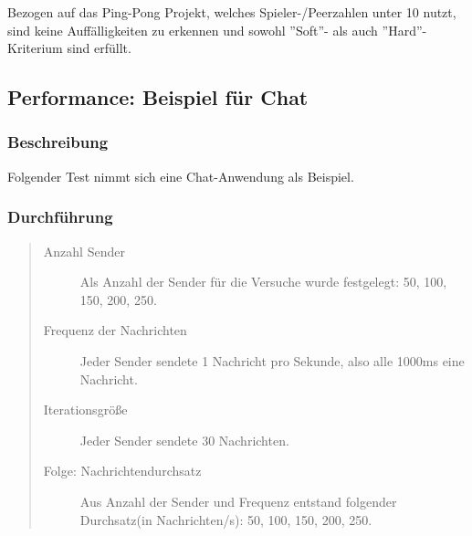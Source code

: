 Bezogen auf das Ping-Pong Projekt, welches Spieler-/Peerzahlen unter 10 nutzt, sind keine Auffälligkeiten zu erkennen und sowohl ''Soft''- als auch ''Hard''-Kriterium sind erfüllt.




\subsection{Performance: Beispiel für Chat}

\subsubsection{Beschreibung}
Folgender Test nimmt sich eine Chat-Anwendung als Beispiel.



\subsubsection{Durchführung}
\begin{quote}
  \begin{description}
  \item[Anzahl Sender]
  Als Anzahl der Sender für die Versuche wurde festgelegt: 50, 100, 150, 200, 250.

  \item[Frequenz der Nachrichten]
  Jeder Sender sendete 1 Nachricht pro Sekunde, also alle 1000ms eine Nachricht.

  \item[Iterationsgröße]
  Jeder Sender sendete 30 Nachrichten.

  \item[Folge: Nachrichtendurchsatz]
  Aus Anzahl der Sender und Frequenz entstand folgender Durchsatz(in Nachrichten/s): 50, 100, 150, 200, 250.
  \end{description}
\end{quote}



